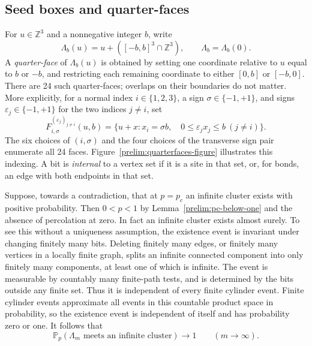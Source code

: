 \subsection{Seed boxes and quarter-faces}

For $u\in\mathbb Z^3$ and a nonnegative integer $b$, write
\[
 \Lambda_b(u)=u+([-b,b]^3\cap\mathbb Z^3),\qquad \Lambda_b=\Lambda_b(0).
\]
A \emph{quarter-face} of $\Lambda_b(u)$ is obtained by setting one coordinate
relative to $u$ equal to $b$ or $-b$, and restricting each remaining coordinate
to either $[0,b]$ or $[-b,0]$. There are 24 such quarter-faces; overlaps on their
boundaries do not matter. More explicitly, for a normal index
$i\in\{1,2,3\}$, a sign $\sigma\in\{-1,+1\}$, and signs
$\varepsilon_j\in\{-1,+1\}$ for the two indices $j\ne i$, set
\begin{equation}\label{prelim:face-index}
 F_{i,\sigma}^{(\varepsilon_j)_{j\ne i}}(u,b)
 =\{u+x:x_i=\sigma b,\quad
                  0\le\varepsilon_jx_j\le b\ (j\ne i)\}.
\end{equation}
The six choices of $(i,\sigma)$ and the four choices of the transverse
sign pair enumerate all 24 faces. Figure~\ref{prelim:quarterfaces-figure}
illustrates this indexing.
A bit is \emph{internal} to a vertex set if it is a
site in that set, or, for bonds, an edge with both endpoints in that set.

\begin{figure}[tbp]

\end{figure}

Suppose, towards a contradiction, that at $p=p_c$ an infinite cluster exists
with positive probability. Then $0<p<1$ by Lemma~\ref{prelim:pc-below-one}
and the absence of percolation at zero. In fact an infinite cluster exists
almost surely. To see this without a uniqueness assumption, the existence event
is invariant under changing finitely many bits. Deleting finitely many edges,
or finitely many vertices in a locally finite graph, splits an infinite
connected component into only finitely many components, at least one of which
is infinite. The event is measurable by countably many finite-path tests, and
is determined by the bits outside any finite set. Thus it is independent of
every finite cylinder event. Finite cylinder events approximate all events
in this countable product space in probability, so the existence event is
independent of itself and has probability zero or one.
It follows that
\begin{equation}\label{prelim:seed-infinite}
 \mathbb P_p(\Lambda_m\text{ meets an infinite cluster})\longrightarrow1
 \qquad(m\longrightarrow\infty).
\end{equation}

